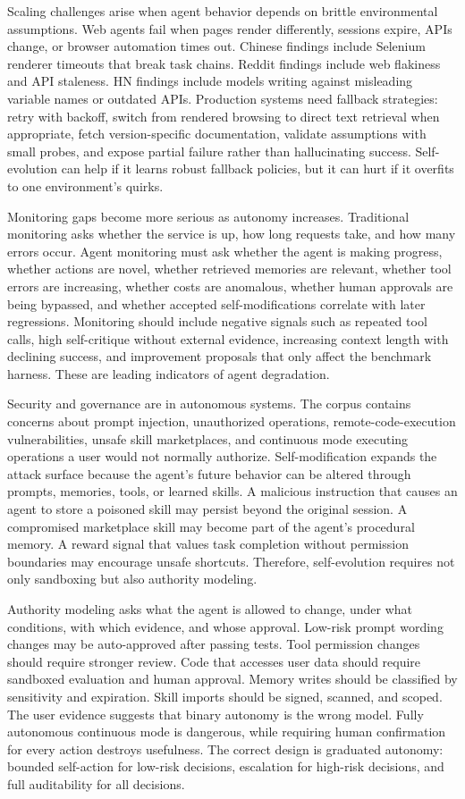 Scaling challenges arise when agent behavior depends on brittle environmental assumptions. Web agents fail when pages render differently, sessions expire, APIs change, or browser automation times out. Chinese findings include Selenium renderer timeouts that break task chains. Reddit findings include web flakiness and API staleness. HN findings include models writing against misleading variable names or outdated APIs. Production systems need fallback strategies: retry with backoff, switch from rendered browsing to direct text retrieval when appropriate, fetch version-specific documentation, validate assumptions with small probes, and expose partial failure rather than hallucinating success. Self-evolution can help if it learns robust fallback policies, but it can hurt if it overfits to one environment's quirks.

Monitoring gaps become more serious as autonomy increases. Traditional monitoring asks whether the service is up, how long requests take, and how many errors occur. Agent monitoring must ask whether the agent is making progress, whether actions are novel, whether retrieved memories are relevant, whether tool errors are increasing, whether costs are anomalous, whether human approvals are being bypassed, and whether accepted self-modifications correlate with later regressions. Monitoring should include negative signals such as repeated tool calls, high self-critique without external evidence, increasing context length with declining success, and improvement proposals that only affect the benchmark harness. These are leading indicators of agent degradation.

Security and governance are \sevcritical{} in autonomous systems. The corpus contains concerns about prompt injection, unauthorized operations, remote-code-execution vulnerabilities, unsafe skill marketplaces, and continuous mode executing operations a user would not normally authorize. Self-modification expands the attack surface because the agent's future behavior can be altered through prompts, memories, tools, or learned skills. A malicious instruction that causes an agent to store a poisoned skill may persist beyond the original session. A compromised marketplace skill may become part of the agent's procedural memory. A reward signal that values task completion without permission boundaries may encourage unsafe shortcuts. Therefore, self-evolution requires not only sandboxing but also authority modeling.

Authority modeling asks what the agent is allowed to change, under what conditions, with which evidence, and whose approval. Low-risk prompt wording changes may be auto-approved after passing tests. Tool permission changes should require stronger review. Code that accesses user data should require sandboxed evaluation and human approval. Memory writes should be classified by sensitivity and expiration. Skill imports should be signed, scanned, and scoped. The user evidence suggests that binary autonomy is the wrong model. Fully autonomous continuous mode is dangerous, while requiring human confirmation for every action destroys usefulness. The correct design is graduated autonomy: bounded self-action for low-risk decisions, escalation for high-risk decisions, and full auditability for all decisions.

